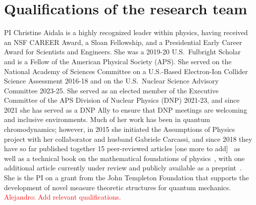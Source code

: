 \section{Qualifications of the research team}
PI Christine Aidala is a highly recognized leader within physics, having received an NSF CAREER Award, a Sloan Fellowship, and a Presidential Early Career Award for Scientists and Engineers. She was a 2019-20 U.S.~Fulbright Scholar and is a Fellow of the American Physical Society (APS).  She served on the National Academy of Sciences Committee on a U.S.-Based Electron-Ion Collider Science Assessment 2016-18 and on the U.S.~Nuclear Science Advisory Committee 2023-25.  She served as an elected member of the Executive Committee of the APS Division of Nuclear Physics (DNP) 2021-23, and since 2021 she has served as a DNP Ally to ensure that DNP meetings are welcoming and inclusive environments.  Much of her work has been in quantum chromodynamics; however, in 2015 she initiated the Assumptions of Physics project with her collaborator and husband Gabriele Carcassi, and since 2018 they have so far published together 15 peer-reviewed articles [one more to add]~\cite{aop-phys-blueprint,aop-topExpDisting,aop-HamQuantInfo,Carcassi:2021,aop-spacetimeStruct,aop-HamConsInfoEnt,Carcassi2021four,Carcassi:2022bpm,aop-HamPriv,aop-commonLogical,aop-action,aop-nogo,aop-nonaddmeas,aop-unphysHilbert} as well as a technical book on the mathematical foundations of physics~\cite{aop-book}, with one additional article currently under review and publicly available as a preprint~\cite{aop-classicallimit}.  She is the PI on a grant from the John Templeton Foundation that supports the development of novel measure theoretic structures for quantum mechanics. \\

\textcolor{red}{Alejandro: Add relevant qualifications.}

